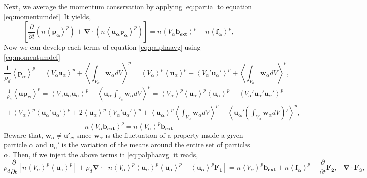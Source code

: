 Next, we average the momentum conservation by applying \ref{eq:partia} to equation \ref{eq:momentumdef}. 
It yields,
\begin{equation}
    \left[\frac{\partial }{\partial t}(n\left<\bm{p_\alpha}\right>^p) 
    + \bm{\nabla}\cdot(n\left<\bm{u_\alpha}\bm{p_\alpha}\right>^p)\right] 
    = n \left<V_\alpha\bm{b_{ext}}\right>^p 
    + n\left<\bm{f_\alpha}\right>^p,
    \label{eq:palphaavg}
\end{equation}  
Now we can develop each terms of equation \ref{eq:palphaavg} using \ref{eq:momentumdef}.
\begin{equation*}
    \frac{1}{\rho_d}\left<\bm{p_\alpha}\right>^p 
    = \left<V_\alpha \bm{u}_\alpha\right>^p
    + \left<\int_{V_\alpha} \bm{w}_\alpha dV\right>^p 
    = \left<V_\alpha\right>^p \left<\bm{u}_\alpha\right>^p
    + \left<V_\alpha' \bm{u}_\alpha'\right>^p
    + \left<\int_{V_\alpha} \bm{w}_\alpha dV\right>^p,
\end{equation*}
\begin{multline*}
    \frac{1}{\rho_d}\left<\bm{u}\bm{p_\alpha}\right>^p 
    = \left<V_\alpha \bm{u}_\alpha\bm{u}_\alpha\right>^p
    + \left<\bm{u_\alpha}\int_{V_\alpha} \bm{w}_\alpha dV\right>^p 
    = \left<V_\alpha\right>^p \left<\bm{u}_\alpha\right>^p \left<\bm{u}_\alpha\right>^p
    + \left<V_\alpha' \bm{u}_\alpha'\bm{u}_\alpha'\right>^p\\
    + \left<V_\alpha\right>^p \left<\bm{u}_\alpha'\bm{u}_\alpha'\right>^p
    + 2 \left<\bm{u}_\alpha\right>^p \left<V_\alpha'\bm{u}_\alpha'\right>^p
    + \left<\bm{u_\alpha}\right>^p\left<\int_{V_\alpha} \bm{w}_\alpha dV\right>^p
    + \left<\bm{u_\alpha}'\left(\int_{V_\alpha} \bm{w}_\alpha dV\right)'\right>^p,
\end{multline*}
\begin{equation*}
    n \left<V_\alpha\bm{b_{ext}}\right>^p 
    = n \left<V_\alpha\right>^p\bm{b_{ext}}
\end{equation*}
Beware that, $ \bm{w}_\alpha  \neq \bm{u'_\alpha}$ since $\bm{w}_\alpha $ is the fluctuation of a property inside a given particle $\alpha$ and $\bm{u}_\alpha'$ is the variation of the means around the entire set of particles $\alpha$. 
Then, if we inject the above terms in \ref{eq:palphaavg} it reads,
\begin{equation}
    \rho_d 
    \frac{\partial }{\partial t}
    \left[
        n\left<V_\alpha\right>^p \left<\bm{u}_\alpha\right>^p
    \right] 
    + \rho_d\bm{\nabla}\cdot
    \left[
        n\left<V_\alpha\right>^p \left<\bm{u}_\alpha\right>^p \left<\bm{u}_\alpha\right>^p
    + \left<\bm{u_\alpha}\right>^p \bm{F_1}
    \right]
    = n \left<V_\alpha\right>^p\bm{b_{ext}} 
    + n\left<\bm{f_\alpha}\right>^p
    - \frac{\partial }{\partial t}\bm{F_2},
    - \bm{\nabla}\cdot\bm{F_3},
    \label{eq:particlesAVG}
\end{equation} 

